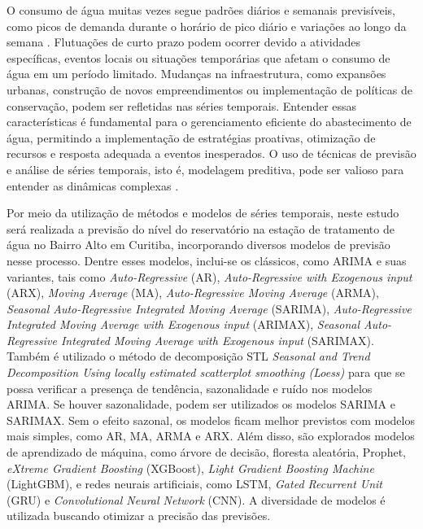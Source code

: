 O consumo de água muitas vezes segue padrões diários e semanais previsíveis, como picos de demanda durante o horário de pico diário e variações ao longo da semana \cite{SIEGEL2020103481}. Flutuações de curto prazo podem ocorrer devido a atividades específicas, eventos locais ou situações temporárias que afetam o consumo de água em um período limitado. Mudanças na infraestrutura, como expansões urbanas, construção de novos empreendimentos ou implementação de políticas de conservação, podem ser refletidas nas séries temporais. Entender essas características é fundamental para o gerenciamento eficiente do abastecimento de água, permitindo a implementação de estratégias proativas, otimização de recursos e resposta adequada a eventos inesperados. O uso de técnicas de previsão e análise de séries temporais, isto é, modelagem preditiva, pode ser valioso para entender as dinâmicas complexas \cite{UCCASTILLO2023105788}.

Por meio da utilização de métodos e modelos de séries temporais, neste estudo será realizada a previsão do nível do reservatório na estação de tratamento de água no Bairro Alto em Curitiba, incorporando diversos modelos de previsão nesse processo. Dentre esses modelos, inclui-se os clássicos, como ARIMA e suas variantes, tais como \textit{Auto-Regressive} (AR), \textit{Auto-Regressive with Exogenous input} (ARX), \textit{Moving Average} (MA), \textit{Auto-Regressive Moving Average} (ARMA), \textit{Seasonal Auto-Regressive Integrated Moving Average} (SARIMA), \textit{Auto-Regressive Integrated Moving Average with Exogenous input} (ARIMAX), \textit{Seasonal Auto-Regressive Integrated Moving Average with Exogenous input} (SARIMAX). Também é utilizado o método de decomposição STL \textit{Seasonal and Trend Decomposition Using locally estimated scatterplot smoothing (Loess)} para que se possa verificar a presença de tendência, sazonalidade e ruído nos modelos ARIMA. Se houver sazonalidade, podem ser utilizados os modelos SARIMA e SARIMAX. Sem o efeito sazonal, os modelos ficam melhor previstos com modelos mais simples, como AR, MA, ARMA e ARX. Além disso, são explorados modelos de aprendizado de máquina, como árvore de decisão, floresta aleatória, Prophet, \textit{eXtreme Gradient Boosting} (XGBoost), \textit{Light Gradient Boosting Machine} (LightGBM), e redes neurais artificiais, como LSTM, \textit{Gated Recurrent Unit} (GRU) e \textit{Convolutional Neural Network} (CNN). A diversidade de modelos é utilizada buscando otimizar a precisão das previsões.

